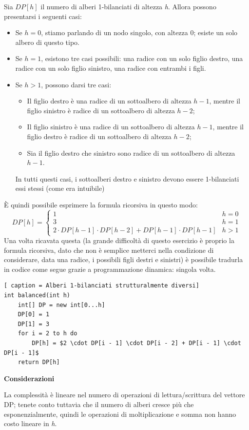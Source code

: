 \documentclass[../cheatSheetAlgoritmi.tex]{subfiles}
\begin{document}
Sia $DP[h]$ il numero di alberi 1-bilanciati di altezza \emph{h}. Allora possono presentarsi i seguenti casi:
\begin{itemize}
	\item Se $h = 0$, stiamo parlando di un nodo singolo, con altezza 0; esiste un solo albero di questo tipo.
	\item Se $h = 1$, esistono tre casi possibili: una radice con un solo figlio destro, una radice con un solo figlio sinistro, una radice con entrambi i figli.
	\item Se $h > 1$, possono darsi tre casi: 
		\begin{itemize}
			\item Il figlio destro è una radice di un sottoalbero di altezza $h - 1$, mentre il figlio sinistro è radice di un sottoalbero di altezza $h - 2$;
			\item Il figlio sinistro è una radice di un sottoalbero di altezza $h - 1$, mentre il figlio destro è radice di un sottoalbero di altezza $h - 2$;
			\item Sia il figlio destro che sinistro sono radice di un sottoalbero di altezza $h - 1$.
		\end{itemize}
		In tutti questi casi, i sottoalberi destro e sinistro devono essere 1-bilanciati essi stessi (come era intuibile)
\end{itemize}
È quindi possibile esprimere la formula ricorsiva in questo modo: 
\begin{equation*}
  	DP[h] =\begin{cases}
    	1 & \text{$h = 0$}\\
    	3 & \text{$h = 1$}\\
    	2 \cdot DP[h - 1] \cdot DP[h - 2]  + DP[h - 1] \cdot DP[h - 1] & \text{$h > 1$}
  	\end{cases}
\end{equation*}
Una volta ricavata questa (la grande difficoltà di questo esercizio è proprio la formula ricorsiva, dato che non è semplice metterci nella condizione di considerare, data una radice, i possibili figli destri e sinistri) è possibile tradurla in codice come segue grazie a programmazione dinamica:
singola volta.
\begin{lstlisting}[ caption = Alberi 1-bilanciati strutturalmente diversi]
int balanced(int h)
	int[] DP = new int[0...h]
	DP[0] = 1
	DP[1] = 3
	for i = 2 to h do
		DP[h] = $2 \cdot DP[i - 1] \cdot DP[i - 2] + DP[i - 1] \cdot DP[i - 1]$
	return DP[h]
\end{lstlisting}
\textbf{Considerazioni} 

La complessità è lineare nel numero di operazioni di lettura/scrittura del vettore DP; tenete conto tuttavia che il numero di alberi cresce più che esponenzialmente, quindi le operazioni di moltiplicazione e somma non hanno costo lineare in \emph{h}.
\newpage
\end{document}

